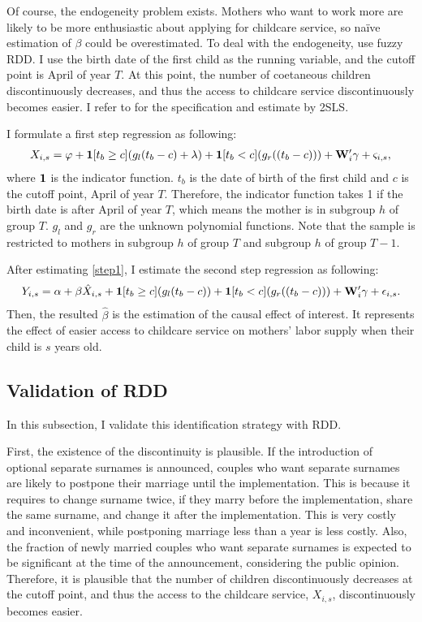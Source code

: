 \documentclass[12pt]{article}
\begin{document}
Of course, the endogeneity problem exists. 
Mothers who want to work more are likely to be more enthusiastic about applying for childcare service, so na\"ive estimation of $\beta$ could be overestimated.
To deal with the endogeneity, use fuzzy RDD.
I use the birth date of the first child as the running variable, and the cutoff point is April of year $T$.
At this point, the number of coetaneous children discontinuously decreases, and thus the access to childcare service discontinuously becomes easier.
I refer to \cite{Dahl2014-bm} for the specification and estimate by 2SLS.


I formulate a first step regression as following: 
\begin{align}
  X_{i,s} = \varphi + \vb{1}[t_b\geq c](g_l(t_b-c)+\lambda) + \vb{1}[t_b<c](g_r((t_b-c))) + \vb{W}_{i}'\vb{\gamma} + \varsigma_{i,s}, \label{step1} 
\end{align}
where $\vb{1}$ is the indicator function. 
$t_b$ is the date of birth of the first child and $c$ is the cutoff point, April of year $T$. 
Therefore, the indicator function takes 1 if the birth date is after April of year $T$, which means the mother is in subgroup $h$ of group $T$.
$g_l$ and $g_r$ are the unknown polynomial functions.
Note that the sample is restricted to mothers in subgroup $h$ of group $T$ and subgroup $h$ of group $T-1$.


After estimating \eqref{step1}, I estimate the second step regression as following:
\begin{align}
  Y_{i,s} = \alpha + \beta \hat{X}_{i,s} + \vb{1}[t_b\geq c](g_l(t_b-c)) + \vb{1}[t_b<c](g_r((t_b-c))) + \vb{W}_{i}'\vb{\gamma} + \epsilon_{i,s}. \label{step2}
\end{align}
Then, the resulted $\hat{\beta}$ is the estimation of the causal effect of interest. 
It represents the effect of easier access to childcare service on mothers' labor supply when their child is $s$ years old.


\subsection*{Validation of RDD}
In this subsection, I validate this identification strategy with RDD. 


First, the existence of the discontinuity is plausible.
If the introduction of optional separate surnames is announced, couples who want separate surnames are likely to postpone their marriage until the implementation.
This is because it requires to change surname twice, if they marry before the implementation, share the same surname, and change it after the implementation. 
This is very costly and inconvenient, while postponing marriage less than a year is less costly.
Also, the fraction of newly married couples who want separate surnames is expected to be significant at the time of the announcement, considering the public opinion.
Therefore, it is plausible that the number of children discontinuously decreases at the cutoff point, and thus the access to the childcare service, $X_{i,s}$, discontinuously becomes easier.
\end{document}
